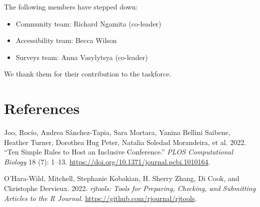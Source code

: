 The following members have stepped down:

\begin{itemize}
\tightlist
\item
  Community team: Richard Ngamita (co-leader)
\item
  Accessibility team: Becca Wilson
\item
  Surveys team: Anna Vasylytsya (co-leader)
\end{itemize}

\noindent We thank them for their contribution to the taskforce.

\hypertarget{references}{%
\section*{References}\label{references}}

\hypertarget{refs}{}
\begin{CSLReferences}{1}{0}
\leavevmode{}%
Joo, Rocío, Andrea Sánchez-Tapia, Sara Mortara, Yanina Bellini Saibene, Heather Turner, Dorothea Hug Peter, Natalia Soledad Morandeira, et al. 2022. {``Ten Simple Rules to Host an Inclusive Conference.''} \emph{PLOS Computational Biology} 18 (7): 1--13. \url{https://doi.org/10.1371/journal.pcbi.1010164}.

\leavevmode{}%
O'Hara-Wild, Mitchell, Stephanie Kobakian, H. Sherry Zhang, Di Cook, and Christophe Dervieux. 2022. \emph{{rjtools: Tools for Preparing, Checking, and Submitting Articles to the R Journal}}. \url{https://github.com/rjournal/rjtools}.

\end{CSLReferences}



\address{%
Heather Turner\\
University of Warwick\\%
UK\\
%
%
%
\href{mailto:Heather.Turner@R-Project.org}{\nolinkurl{Heather.Turner@R-Project.org}}%
}
